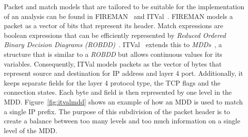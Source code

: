 Packet and match models that are tailored to be suitable for the implementation of an analysis can be found in FIREMAN~\cite{yuan2006fireman} and ITVal~\cite{marmorstein2005tool}.
FIREMAN models a packet as a vector of bits that represent its header.
Match expressions are boolean expressions that can be efficiently represented by \emph{Reduced Ordered Binary Decision Diagrams (ROBDD)}~\cite{bryant1986graph}.
ITVal~\cite{marmorstein2005tool} extends this to \emph{MDDs}~\cite{liaw1992obdd}, a structure that is similar to a \emph{ROBDD} but allows continuous values for its variables.
Consequently, ITVal models packets as the vector of bytes that represent source and destination for IP address and layer 4 port.
Additionally, it keeps separate fields for the layer 4 protocol type, the TCP flags and the connection states.
Each byte and field is then represented by one level in the MDD.
Figure~\ref{fig:itvalmdd} shows an example of how an MDD is used to match a single IP prefix.
The purpose of this subdivision of the packet header is to create a balance between too many levels and too much information on a single level of the MDD.
